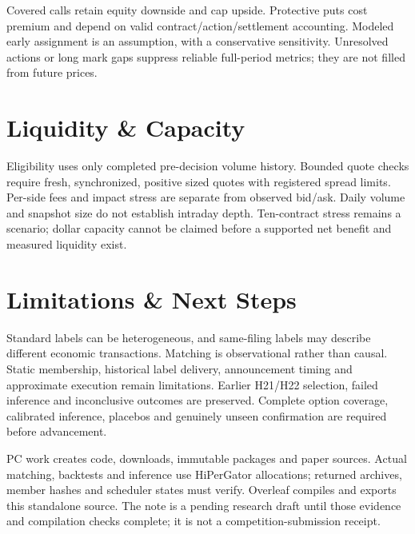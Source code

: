 \documentclass[11pt,letterpaper]{article}
\begin{document}
Covered calls retain equity downside and cap upside. Protective puts cost premium and depend on valid contract/action/settlement accounting. Modeled early assignment is an assumption, with a conservative sensitivity. Unresolved actions or long mark gaps suppress reliable full-period metrics; they are not filled from future prices.

\section{Liquidity \& Capacity}
Eligibility uses only completed pre-decision volume history. Bounded quote checks require fresh, synchronized, positive sized quotes with registered spread limits. Per-side fees and impact stress are separate from observed bid/ask. Daily volume and snapshot size do not establish intraday depth. Ten-contract stress remains a scenario; dollar capacity cannot be claimed before a supported net benefit and measured liquidity exist.

\section{Limitations \& Next Steps}
Standard labels can be heterogeneous, and same-filing labels may describe different economic transactions. Matching is observational rather than causal. Static membership, historical label delivery, announcement timing and approximate execution remain limitations. Earlier H21/H22 selection, failed inference and inconclusive outcomes are preserved. Complete option coverage, calibrated inference, placebos and genuinely unseen confirmation are required before advancement.

PC work creates code, downloads, immutable packages and paper sources. Actual matching, backtests and inference use HiPerGator allocations; returned archives, member hashes and scheduler states must verify. Overleaf compiles and exports this standalone source. The note is a pending research draft until those evidence and compilation checks complete; it is not a competition-submission receipt.


\label{mainend}
\clearpage
\end{document}
